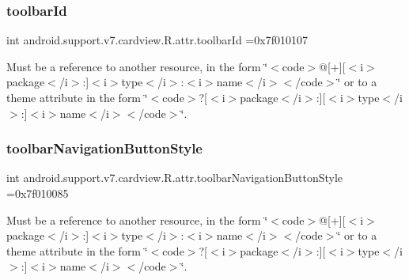 \subsubsection{\texorpdfstring{toolbar\+Id}{toolbarId}}
{\footnotesize\ttfamily int android.\+support.\+v7.\+cardview.\+R.\+attr.\+toolbar\+Id =0x7f010107\hspace{0.3cm}{\ttfamily [static]}}

Must be a reference to another resource, in the form \char`\"{}$<$code$>$@\mbox{[}+\mbox{]}\mbox{[}$<$i$>$package$<$/i$>$\+:\mbox{]}$<$i$>$type$<$/i$>$\+:$<$i$>$name$<$/i$>$$<$/code$>$\char`\"{} or to a theme attribute in the form \char`\"{}$<$code$>$?\mbox{[}$<$i$>$package$<$/i$>$\+:\mbox{]}\mbox{[}$<$i$>$type$<$/i$>$\+:\mbox{]}$<$i$>$name$<$/i$>$$<$/code$>$\char`\"{}. \mbox{\label{classandroid_1_1support_1_1v7_1_1cardview_1_1R_1_1attr_ae9cf75ca8aefa0117e4e6fddd9c56df2}} 
\subsubsection{\texorpdfstring{toolbar\+Navigation\+Button\+Style}{toolbarNavigationButtonStyle}}
{\footnotesize\ttfamily int android.\+support.\+v7.\+cardview.\+R.\+attr.\+toolbar\+Navigation\+Button\+Style =0x7f010085\hspace{0.3cm}{\ttfamily [static]}}

Must be a reference to another resource, in the form \char`\"{}$<$code$>$@\mbox{[}+\mbox{]}\mbox{[}$<$i$>$package$<$/i$>$\+:\mbox{]}$<$i$>$type$<$/i$>$\+:$<$i$>$name$<$/i$>$$<$/code$>$\char`\"{} or to a theme attribute in the form \char`\"{}$<$code$>$?\mbox{[}$<$i$>$package$<$/i$>$\+:\mbox{]}\mbox{[}$<$i$>$type$<$/i$>$\+:\mbox{]}$<$i$>$name$<$/i$>$$<$/code$>$\char`\"{}. \mbox{\label{classandroid_1_1support_1_1v7_1_1cardview_1_1R_1_1attr_a15aeffa2084d228a200644658187a6cf}} 
